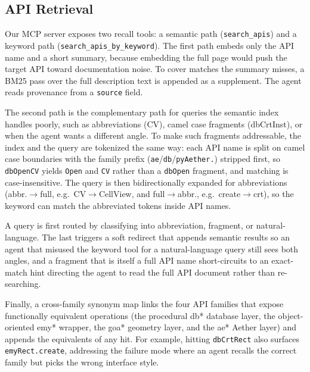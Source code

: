 \documentclass[conference]{IEEEtran}
\begin{document}
\subsection{API Retrieval}
\label{sec:method_retrieval}

Our MCP server exposes two recall tools: a semantic path (\texttt{search\_apis}) and a keyword path (\texttt{search\_apis\_by\_keyword}). The first path embeds only the API name and a short summary, because embedding the full page would push the target API toward documentation noise. To cover matches the summary misses, a BM25 pass over the full description text is appended as a supplement. The agent reads provenance from a \texttt{source} field.

The second path is the complementary path for queries the semantic index handles poorly, such as abbreviations (CV), camel case fragments (dbCrtInst), or when the agent wants a different angle. To make such fragments addressable, the index and the query are tokenized the same way: each API name is split on camel case boundaries with the family prefix (\texttt{ae}/\texttt{db}/\texttt{pyAether.}) stripped first, so \texttt{dbOpenCV} yields \texttt{Open} and \texttt{CV} rather than a \texttt{dbOpen} fragment, and matching is case-insensitive. The query is then bidirectionally expanded for abbreviations (abbr.$\to$full, e.g.\ CV$\to$CellView, and full$\to$abbr., e.g.\ create$\to$crt), so the keyword can match the abbreviated tokens inside API names.

A query is first routed by classifying into abbreviation, fragment, or natural-language. The last triggers a soft redirect that appends semantic results so an agent that misused the keyword tool for a natural-language query still sees both angles, and a fragment that is itself a full API name short-circuits to an exact-match hint directing the agent to read the full API document rather than re-searching.

Finally, a cross-family synonym map links the four API families that expose functionally equivalent operations (the procedural db* database layer, the object-oriented emy* wrapper, the goa* geometry layer, and the ae* Aether layer) and appends the equivalents of any hit. For example, hitting \texttt{dbCrtRect} also surfaces \texttt{emyRect.create}, addressing the failure mode where an agent recalls the correct family but picks the wrong interface style.
\end{document}

